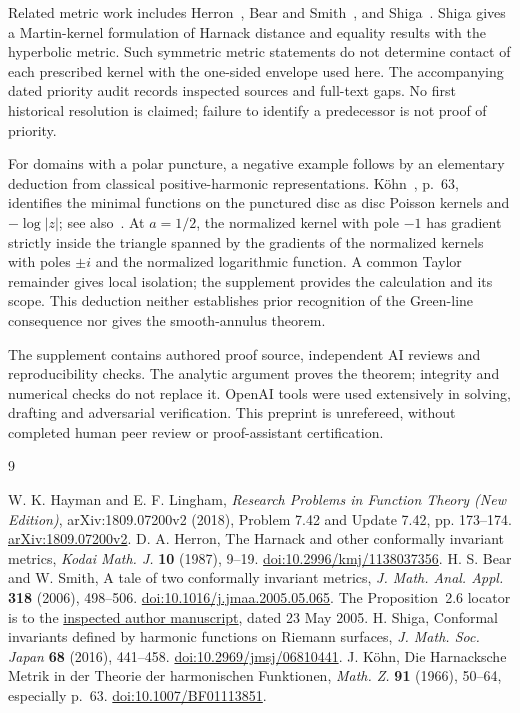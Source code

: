 \documentclass[11pt]{article}
\begin{document}
Related metric work includes Herron~\cite{Herron}, Bear and Smith~\cite{BS}, and Shiga~\cite{Shiga}. Shiga gives a Martin-kernel formulation of Harnack distance and equality results with the hyperbolic metric. Such symmetric metric statements do not determine contact of each prescribed kernel with the one-sided envelope used here. The accompanying dated priority audit records inspected sources and full-text gaps. No first historical resolution is claimed; failure to identify a predecessor is not proof of priority.

For domains with a polar puncture, a negative example follows by an elementary deduction from classical positive-harmonic representations. K\"ohn~\cite{Kohn}, p.~63, identifies the minimal functions on the punctured disc as disc Poisson kernels and $-\log|z|$; see also~\cite[Proposition~2.6]{BS}. At $a=1/2$, the normalized kernel with pole $-1$ has gradient strictly inside the triangle spanned by the gradients of the normalized kernels with poles $\pm i$ and the normalized logarithmic function. A common Taylor remainder gives local isolation; the supplement provides the calculation and its scope. This deduction neither establishes prior recognition of the Green-line consequence nor gives the smooth-annulus theorem.

The supplement contains authored proof source, independent AI reviews and reproducibility checks. The analytic argument proves the theorem; integrity and numerical checks do not replace it. OpenAI tools were used extensively in solving, drafting and adversarial verification. This preprint is unrefereed, without completed human peer review or proof-assistant certification.

\clearpage
\begin{thebibliography}{9}
\small\raggedright
{} W. K. Hayman and E. F. Lingham,
\emph{Research Problems in Function Theory (New Edition)},
arXiv:1809.07200v2 (2018), Problem 7.42 and Update 7.42, pp. 173--174.
\href{https://arxiv.org/abs/1809.07200v2}{arXiv:1809.07200v2}.
 D. A. Herron,
The Harnack and other conformally invariant metrics,
\emph{Kodai Math. J.} \textbf{10} (1987), 9--19.
\href{https://doi.org/10.2996/kmj/1138037356}{doi:10.2996/kmj/1138037356}.
 H. S. Bear and W. Smith,
A tale of two conformally invariant metrics,
\emph{J. Math. Anal. Appl.} \textbf{318} (2006), 498--506.
\href{https://doi.org/10.1016/j.jmaa.2005.05.065}{doi:10.1016/j.jmaa.2005.05.065}.
The Proposition~2.6 locator is to the \href{https://math.hawaii.edu/~wayne/mathpapers/harnack.pdf}{inspected author manuscript}, dated 23 May 2005.
 H. Shiga,
Conformal invariants defined by harmonic functions on Riemann surfaces,
\emph{J. Math. Soc. Japan} \textbf{68} (2016), 441--458.
\href{https://doi.org/10.2969/jmsj/06810441}{doi:10.2969/jmsj/06810441}.
 J. K\"ohn,
Die Harnacksche Metrik in der Theorie der harmonischen Funktionen,
\emph{Math. Z.} \textbf{91} (1966), 50--64, especially p.~63.
\href{https://doi.org/10.1007/BF01113851}{doi:10.1007/BF01113851}.
\end{thebibliography}
\end{document}
